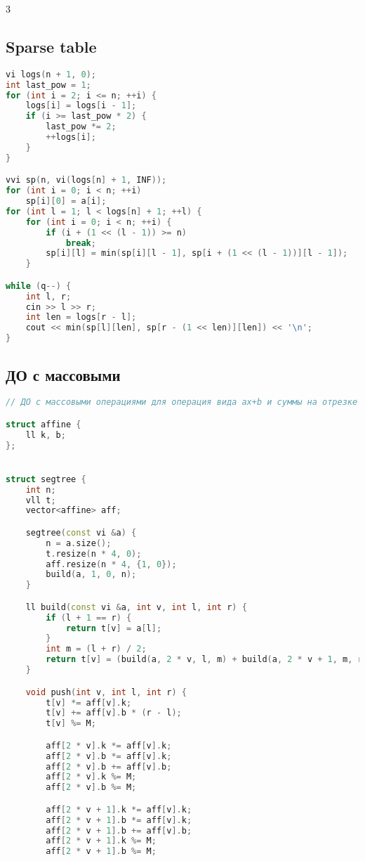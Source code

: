 \documentclass[10pt,a4paper,landscape,twosided]{extarticle}
\begin{document}
\begin{multicols}{3}
\subsection{Sparse table}
\begin{lstlisting}[language=C++]
vi logs(n + 1, 0);
int last_pow = 1;
for (int i = 2; i <= n; ++i) {
    logs[i] = logs[i - 1];
    if (i >= last_pow * 2) {
        last_pow *= 2;
        ++logs[i];
    }
}

vvi sp(n, vi(logs[n] + 1, INF));
for (int i = 0; i < n; ++i)
    sp[i][0] = a[i];
for (int l = 1; l < logs[n] + 1; ++l) {
    for (int i = 0; i < n; ++i) {
        if (i + (1 << (l - 1)) >= n)
            break;
        sp[i][l] = min(sp[i][l - 1], sp[i + (1 << (l - 1))][l - 1]);
    }

while (q--) {
    int l, r;
    cin >> l >> r;
    int len = logs[r - l];
    cout << min(sp[l][len], sp[r - (1 << len)][len]) << '\n';
}
\end{lstlisting}

\subsection{ДО с массовыми}
\begin{lstlisting}[language=C++]
// ДО с массовыми операциями для операция вида ax+b и суммы на отрезке по модулю

struct affine {
    ll k, b;
};


struct segtree {
    int n;
    vll t;
    vector<affine> aff;

    segtree(const vi &a) {
        n = a.size();
        t.resize(n * 4, 0);
        aff.resize(n * 4, {1, 0});
        build(a, 1, 0, n);
    }

    ll build(const vi &a, int v, int l, int r) {
        if (l + 1 == r) {
            return t[v] = a[l];
        }
        int m = (l + r) / 2;
        return t[v] = (build(a, 2 * v, l, m) + build(a, 2 * v + 1, m, r)) % M;
    }

    void push(int v, int l, int r) {
        t[v] *= aff[v].k;
        t[v] += aff[v].b * (r - l);
        t[v] %= M;

        aff[2 * v].k *= aff[v].k;
        aff[2 * v].b *= aff[v].k;
        aff[2 * v].b += aff[v].b;
        aff[2 * v].k %= M;
        aff[2 * v].b %= M;

        aff[2 * v + 1].k *= aff[v].k;
        aff[2 * v + 1].b *= aff[v].k;
        aff[2 * v + 1].b += aff[v].b;
        aff[2 * v + 1].k %= M;
        aff[2 * v + 1].b %= M;


\end{lstlisting}
\end{multicols}
\end{document}
